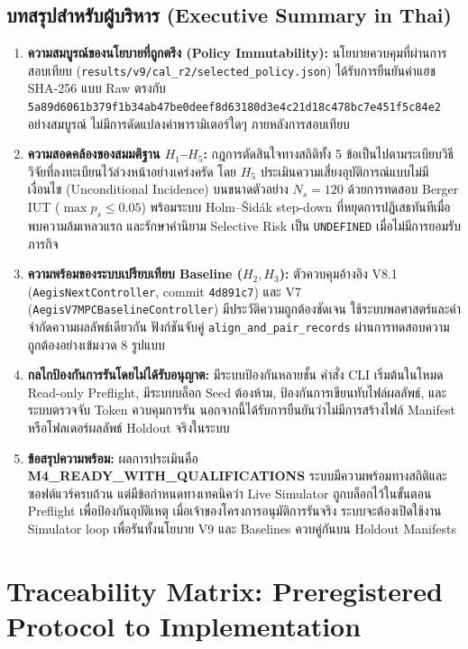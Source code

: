 \documentclass[10pt,a4paper]{article}
\begin{document}
\subsection{\texorpdfstring{บทสรุปสำหรับผู้บริหาร (Executive Summary in Thai)}{Executive Summary in Thai}}
{\thaifont\small
\begin{enumerate}
    \item \textbf{ความสมบูรณ์ของนโยบายที่ถูกตรึง (Policy Immutability):} นโยบายควบคุมที่ผ่านการสอบเทียบ (\texttt{results/v9/cal\_r2/selected\_policy.json}) ได้รับการยืนยันค่าแฮช SHA-256 แบบ Raw ตรงกับ \texttt{5a89d6061b379f1b34ab47be0deef8d63180d3e4c21d18c478bc7e451f5c84e2} อย่างสมบูรณ์ ไม่มีการดัดแปลงค่าพารามิเตอร์ใดๆ ภายหลังการสอบเทียบ
    \item \textbf{ความสอดคล้องของสมมติฐาน $H_1$--$H_5$:} กฎการตัดสินใจทางสถิติทั้ง 5 ข้อเป็นไปตามระเบียบวิธีวิจัยที่ลงทะเบียนไว้ล่วงหน้าอย่างเคร่งครัด โดย $H_5$ ประเมินความเสี่ยงอุบัติการณ์แบบไม่มีเงื่อนไข (Unconditional Incidence) บนขนาดตัวอย่าง $N_s = 120$ ด้วยการทดสอบ Berger IUT ($\max p_s \le 0.05$) พร้อมระบบ Holm--Šidák step-down ที่หยุดการปฏิเสธทันทีเมื่อพบความล้มเหลวแรก และรักษาคำนิยาม Selective Risk เป็น \texttt{UNDEFINED} เมื่อไม่มีการยอมรับภารกิจ
    \item \textbf{ความพร้อมของระบบเปรียบเทียบ Baseline ($H_2, H_3$):} ตัวควบคุมอ้างอิง V8.1 (\texttt{AegisNextController}, commit \texttt{4d891c7}) และ V7 (\texttt{AegisV7MPCBaselineController}) มีประวัติความถูกต้องชัดเจน ใช้ระบบพลศาสตร์และคำจำกัดความผลลัพธ์เดียวกัน ฟังก์ชันจับคู่ \texttt{align\_and\_pair\_records} ผ่านการทดสอบความถูกต้องอย่างเข้มงวด 8 รูปแบบ
    \item \textbf{กลไกป้องกันการรันโดยไม่ได้รับอนุญาต:} มีระบบป้องกันหลายชั้น คำสั่ง CLI เริ่มต้นในโหมด Read-only Preflight, มีระบบบล็อก Seed ต้องห้าม, ป้องกันการเขียนทับไฟล์ผลลัพธ์, และระบบตรวจจับ Token ควบคุมการรัน นอกจากนี้ได้รับการยืนยันว่าไม่มีการสร้างไฟล์ Manifest หรือโฟลเดอร์ผลลัพธ์ Holdout จริงในระบบ
    \item \textbf{ข้อสรุปความพร้อม:} ผลการประเมินคือ \textbf{M4\_READY\_WITH\_QUALIFICATIONS} ระบบมีความพร้อมทางสถิติและซอฟต์แวร์ครบถ้วน แต่มีข้อกำหนดทางเทคนิคว่า Live Simulator ถูกบล็อกไว้ในขั้นตอน Preflight เพื่อป้องกันอุบัติเหตุ เมื่อเจ้าของโครงการอนุมัติการรันจริง ระบบจะต้องเปิดใช้งาน Simulator loop เพื่อรันทั้งนโยบาย V9 และ Baselines ควบคู่กันบน Holdout Manifests
\end{enumerate}
}

\section{Traceability Matrix: Preregistered Protocol to Implementation}
\end{document}
